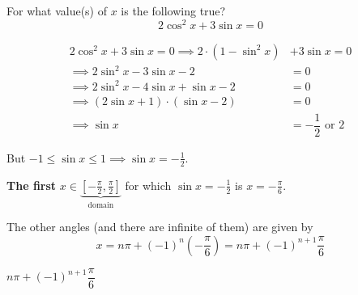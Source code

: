 

\question[3] For what value(s) of $x$ is the following true? 
\[ 2\cos^2 x + 3\sin x = 0 \]

\begin{solution}[\halfpage]
	\begin{align}
		2\cos^2 x + 3\sin x = 0 \implies 2\cdot(1-\sin^2 x) &+ 3 \sin x = 0 \\
		\implies 2\sin^2 x - 3\sin x - 2 &= 0 \\
    \implies 2\sin^2 x - 4\sin x + \sin x - 2 &= 0 \\
    \implies (2\sin x + 1)\cdot (\sin x - 2) &= 0\\
    \implies \sin x &= -\dfrac{1}{2}\text{ or } 2
	\end{align}

  But $-1\leq \sin x \leq 1\implies \sin x = -\frac{1}{2}$. 

  \textbf{The first }$x\in\underbrace{\left[-\frac\pi{2},\frac\pi{2} \right]}_{\text{domain}}$ 
  for which $\sin x = -\frac{1}{2}$ is $x=-\frac\pi{6}$.
	
  The other angles (and there are infinite of them) are given by 
  \[ x = n\pi + (-1)^n\left( -\dfrac\pi{6}\right) = n\pi + (-1)^{n+1}\dfrac\pi{6} \] 
\end{solution}

\ifprintanswers\begin{codex}$n\pi + (-1)^{n+1}\dfrac\pi{6}$\end{codex}\fi
